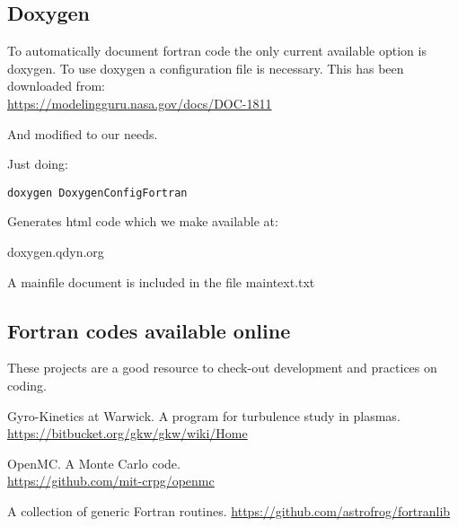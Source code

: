 \documentclass[10pt, oneside, pdftex]{article}
\begin{document}
\subsection{Doxygen}
\label{doxygen}
To  automatically document  fortran  code the  only current  available
option is doxygen.
To  use doxygen  a  configuration  file is  necessary.  This has  been
downloaded from:\\

\url{https://modelingguru.nasa.gov/docs/DOC-1811}

And modified to our needs.

Just doing:

\begin{lstlisting}
doxygen DoxygenConfigFortran
\end{lstlisting}


Generates html code which we make available at:

doxygen.qdyn.org

A mainfile document is included in the file maintext.txt


\subsection{Fortran codes available online}

These  projects  are  a  good resource  to  check-out  development  and
practices on coding.

Gyro-Kinetics at Warwick. A program for turbulence study in plasmas.\\
\url{https://bitbucket.org/gkw/gkw/wiki/Home}

OpenMC. A Monte Carlo code.\\
\url{https://github.com/mit-crpg/openmc}


A collection of generic Fortran routines.
\url{https://github.com/astrofrog/fortranlib}



\end{document}
